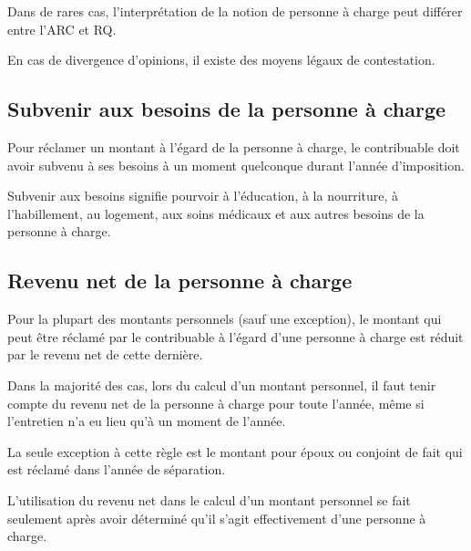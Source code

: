 \begin{note}
	Dans de rares cas, l'interprétation de la notion de personne à charge peut différer entre l'ARC et RQ. 
	
	En cas de divergence d'opinions, il existe des moyens légaux de contestation.
\end{note}


\subsection{Subvenir aux besoins de la personne à charge}
Pour réclamer un montant à l'égard de la personne à charge, le contribuable doit avoir subvenu à ses besoins à un moment quelconque durant l'année d'imposition. 

Subvenir aux besoins signifie pourvoir à l'éducation, à la nourriture, à l'habillement, au logement, aux soins médicaux et aux autres besoins de la personne à charge.


\subsection{Revenu net de la personne à charge}
Pour la plupart des montants personnels (sauf une exception), le montant qui peut être réclamé par le contribuable à l'égard d'une personne à charge est réduit par le revenu net de cette dernière.

Dans la majorité des cas, lors du calcul d'un montant personnel, il faut tenir compte du revenu net de la personne à charge pour toute l'année, même si l'entretien n'a eu lieu qu'à un moment de l'année. 

La seule exception à cette règle est le montant pour époux ou conjoint de fait qui est réclamé dans l'année de séparation.

L'utilisation du revenu net dans le calcul d'un montant personnel se fait seulement après avoir déterminé qu'il s'agit effectivement d'une personne à charge.


